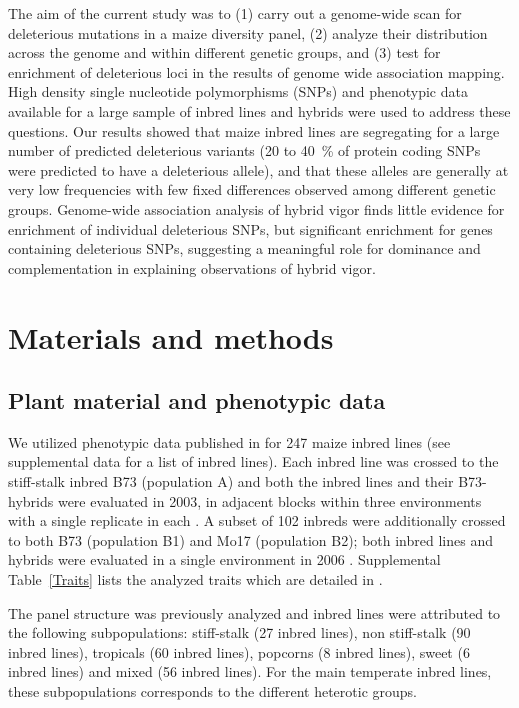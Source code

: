 \documentclass[12pt]{article}
\begin{document}
The aim of the current study was to (1) carry out a genome-wide scan for deleterious mutations in a maize diversity panel, (2) analyze their distribution across the genome and within different genetic groups, and (3) test for enrichment of deleterious loci in the results of genome wide association mapping. High density single nucleotide polymorphisms (SNPs) and phenotypic data available for a large sample of inbred lines and hybrids were used to address these questions. Our results showed that maize inbred lines are segregating for a large number of predicted deleterious variants (20 to 40 \,\% of protein coding SNPs were predicted to have a deleterious allele), and that these alleles are generally at very low frequencies with few fixed differences observed among different genetic groups. Genome-wide association analysis of hybrid vigor finds little evidence for enrichment of individual deleterious SNPs, but significant enrichment for genes containing deleterious SNPs, suggesting a meaningful role for dominance and complementation in explaining observations of hybrid vigor. 

\section*{Materials and methods}
\subsection*{Plant material and phenotypic data}

We utilized phenotypic data published in \citet{Flint-Garcia2005} for 247 maize inbred lines (see supplemental data for a list of inbred lines). Each inbred line was crossed to the stiff-stalk inbred B73 (population A) and both the inbred lines and their B73-hybrids were evaluated in 2003, in adjacent blocks within three environments with a single replicate in each \citep{Flint-Garcia2009}. A subset of 102 inbreds were additionally crossed to both B73 (population B1) and Mo17 (population B2); both inbred lines and hybrids were evaluated in a single environment in 2006 \citep{Flint-Garcia2009}. Supplemental Table~\ref{Traits} lists the analyzed traits which are detailed in \citet{Flint-Garcia2009}.

The panel structure was previously analyzed \citep{Flint-Garcia2005} and inbred lines were attributed to the following subpopulations: stiff-stalk (27 inbred lines), non stiff-stalk (90 inbred lines), tropicals (60 inbred lines), popcorns (8 inbred lines), sweet (6 inbred lines) and mixed (56 inbred lines). For the main temperate inbred lines, these subpopulations corresponds to the different heterotic groups.
\end{document}
